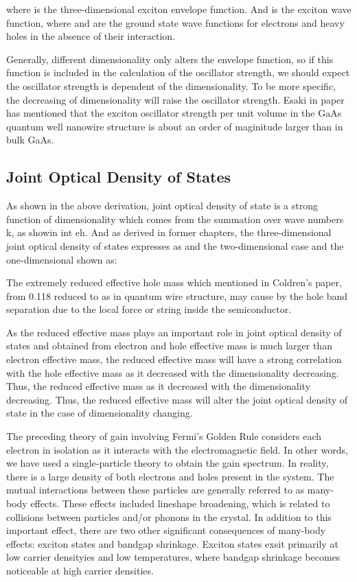 where is the three-dimensional exciton envelope function. And is the exciton
wave function, where and are the ground state wave functions for electrons and
heavy holes in the absence of their interaction.

Generally, different dimensionality only alters the envelope function, so if
this function is included in the calculation of the oscillator strength, we
should expect the oscillator strength is dependent of the dimensionality. To be
more specific, the decreasing of dimensionality will raise the oscillator
strength. Esaki in paper has mentioned that the exciton oscillator strength per
unit volume in the GaAs quantum well nanowire structure is about an order of
maginitude larger than in bulk GaAs.

\subsection{Joint Optical Density of States}

As shown in the above derivation, joint optical density of state is a strong function of dimensionality which comes from the summation over wave numbers k, as showin int eh. And as derived in former chapters, the three-dimensional joint optical density of states expresses as
and the two-dimensional case and the one-dimensional shown as:

The extremely reduced effective hole mass which mentioned in Coldren's paper, from 0.118 reduced to as in quantum wire structure, may cause by the hole band separation due to the local force or string inside the semiconductor.

As the reduced effective mass plays an important role in joint optical density
of states and obtained from electron and hole effective mass is much larger
than electron effective mass, the reduced effective mass will have a strong
correlation with the hole effective mass as it decreased with the
dimensionality decreasing. Thus, the reduced effective mass as it decreased
with the dimensionality decreasing. Thus, the reduced effective mass will alter
the joint optical density of state in the case of dimensionality changing.

The preceding theory of gain involving Fermi's Golden Rule considers each
electron in isolation as it interacts with the electromagnetic field. In other
words, we have used a single-particle theory to obtain the gain spectrum. In
reality, there is a large density of both electrons and holes present in the
system. The mutual interactions between these particles are generally referred
to as many-body effects. These effects included lineshape broadening, which is
related to collisions between particles and/or phonons in the crystal. In
addition to this important effect, there are two other significant consequences
of many-body effects: exciton states and bandgap shrinkage. Exciton states
exsit primarily at low carrier densityies and low temperatures, where bandgap
shrinkage becomes noticeable at high carrier densities.

